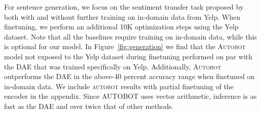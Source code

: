 
For sentence generation, we focus on the sentiment transfer task proposed by \citet{shen2019educating} both with and without further training on in-domain data from Yelp. When finetuning, we perform an additional 10K optimization steps using the Yelp dataset.  Note that all the baselines require training on in-domain data, while this is optional for our model.  In Figure~\ref{fig:generation}
we find that the \textsc{Autobot} model not exposed to the Yelp dataset during finetuning performed on par with the 
DAE that was trained specifically on Yelp. Additionally, \textsc{Autobot} outperforms the DAE in the above-40 percent accuracy range when finetuned on in-domain data.
We include \textsc{autobot} results with partial finetuning of the encoder in the appendix.
Since \textsc{AUTOBOT} uses vector arithmetic, inference is as fast as the DAE and over twice that of other methods.



